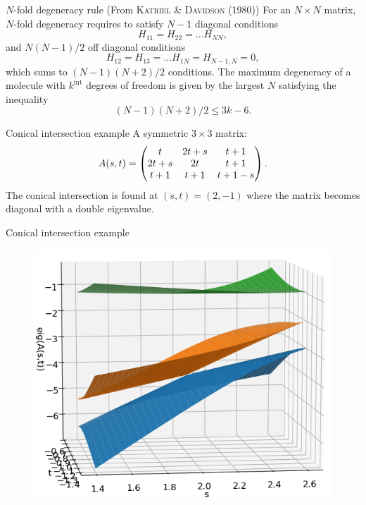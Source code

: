 \documentclass{beamer}
\newcommand\Fontvi{\fontsize{8}{7.2}\selectfont} %
\begin{document}
\begin{frame}{$N$-fold degeneracy rule}
    \Fontvi
    (From \textsc{Katriel \& Davidson} (1980)) For an $N \times N$ matrix, $N$-fold degeneracy requires to satisfy $N-1$ diagonal conditions
    \begin{equation}
        H_{11} = H_{22} = ... H_{NN},
    \end{equation}
    and $N(N-1)/2$ off diagonal conditions
    \begin{equation}
        H_{12} = H_{13} = ... H_{1N} = H_{N-1,N} = 0,
    \end{equation}
    which sums to $(N-1)(N+2)/2$ conditions. The maximum degeneracy of a molecule with $k^\text{int}$ degrees of freedom is given by the largest $N$ satisfying the inequality
    \begin{equation}
        (N-1)(N+2)/2 \leq 3k-6.
    \end{equation}
\end{frame}
\iffalse %
\begin{frame}{Conical intersection example}
    A symmetric $3 \times 3$ matrix:
    \begin{equation}
        A(s,t)=
        \begin{pmatrix}
            t & 2t+s & t+1 \cr 2t+s & 2t & t+1 \cr t+1 & t+1 & t+1-s
        \end{pmatrix}
        .
    \end{equation}
    The conical intersection is found at $(s,t)=(2,-1)$ where the matrix becomes diagonal with a double eigenvalue.
\end{frame}
\begin{frame}{Conical intersection example}
    \begin{figure}[h]
        \centering
        \includegraphics[scale=0.5]{img/slide/conint_3sheet_angle9.png}
        \label{fig:conint}
    \end{figure}
\end{frame}
\end{document}
